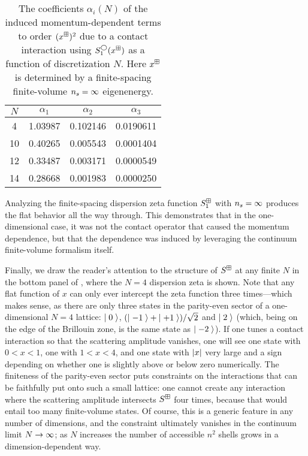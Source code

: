 \begin{table}
    \caption{
    The coefficients $\alpha_i(N)$ of the induced momentum-dependent terms to order $(x^\boxplus)^2$ due to a contact interaction using $S^\bigcirc_1(x^\boxplus)$ as a function of discretization $N$.
    Here $x^\boxplus$ is determined by a finite-spacing finite-volume ${n_s}=\infty$ eigenenergy.}
    \label{tab:induced terms in 1 d}
    \begin{tabular}{S[table-format=2.1]S[table-format=2.6]S[table-format=2.7]S[table-format=2.8]}
{$N$} & {$\alpha_1$} & {$\alpha_2$} & {$\alpha_3$} \\  &   1.03987  & 0.102146 & 0.0190611 \\
    10  &   0.40265  & 0.005543 & 0.0001404 \\
    12  &   0.33487  & 0.003171 & 0.0000549 \\
    14  &   0.28668  & 0.001983 & 0.0000250 \\
    \end{tabular}
\end{table}


Analyzing the finite-spacing dispersion zeta function $S^{\boxplus}_1$ with ${n_s}=\infty$ produces the flat behavior all the way through.
This demonstrates that in the one-dimensional case, it was not the contact operator that caused the momentum dependence, but that the dependence was induced by leveraging the continuum finite-volume formalism itself.

Finally, we draw the reader's attention to the structure of $S^\boxplus$ at any finite $N$ in the bottom panel of , where the $N=4$ dispersion zeta is shown.
Note that any flat function of $x$ can only ever intercept the zeta function three times---which makes sense, as there are only three states in the parity-even sector of a one-dimensional $N=4$ lattice: $\left|\;0\;\right\rangle$, $(\left|\;-1\;\right\rangle+\left|\;+1\;\right\rangle)/\sqrt{2}$ and $\left|\;2\;\right\rangle$ (which, being on the edge of the Brillouin zone, is the same state as $\left|\;-2\;\right\rangle$).
If one tunes a contact interaction so that the scattering amplitude vanishes, one will see one state with $0<x<1$, one with $1<x<4$, and one state with $\left| x \right|$ very large and a sign depending on whether one is slightly above or below zero numerically.
The finiteness of the parity-even sector puts constraints on the interactions that can be faithfully put onto such a small lattice: one cannot create any interaction where the scattering amplitude intersects $S^{\boxplus}$ four times, because that would entail too many finite-volume states.
Of course, this is a generic feature in any number of dimensions, and the constraint ultimately vanishes in the continuum limit $N\rightarrow\infty$; as $N$ increases the number of accessible $n^2$ shells grows in a dimension-dependent way.
